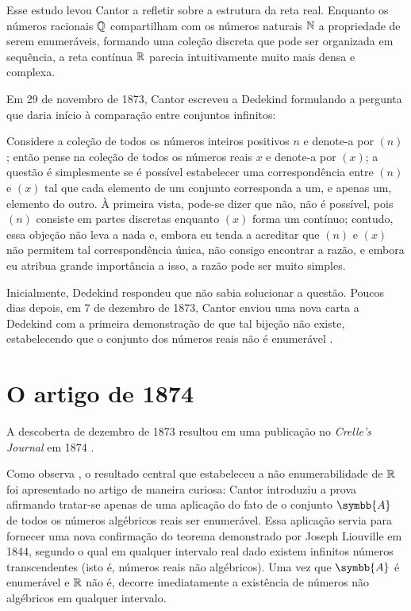 Esse estudo levou Cantor a refletir sobre a estrutura da reta real. Enquanto os números racionais \(\mathbb{Q}\) compartilham com os números naturais \(\mathbb{N}\) a propriedade de serem enumeráveis, formando uma coleção discreta que pode ser organizada em sequência, a reta contínua \(\mathbb{R}\) parecia intuitivamente muito mais densa e complexa.

Em 29 de novembro de 1873, Cantor escreveu a Dedekind formulando a pergunta que daria início à comparação entre conjuntos infinitos:
\begin{citacao}
    Considere a coleção de todos os números inteiros positivos \(n\) e denote-a por \((n)\); então pense na coleção de todos os números reais \(x\) e denote-a por \((x)\); a questão é simplesmente se é possível estabelecer uma correspondência entre \((n)\) e \((x)\) tal que cada elemento de um conjunto corresponda a um, e apenas um, elemento do outro. À primeira vista, pode-se dizer que não, não é possível, pois \((n)\) consiste em partes discretas enquanto \((x)\) forma um contínuo; contudo, essa objeção não leva a nada e, embora eu tenda a acreditar que \((n)\) e \((x)\) não permitem tal correspondência única, não consigo encontrar a razão, e embora eu atribua grande importância a isso, a razão pode ser muito simples. \parencite[p.~50, tradução própria]{dauben1990}
\end{citacao}

Inicialmente, Dedekind respondeu que não sabia solucionar a questão. Poucos dias depois, em 7 de dezembro de 1873, Cantor enviou uma nova carta a Dedekind com a primeira demonstração de que tal bijeção não existe, estabelecendo que o conjunto dos números reais não é enumerável \parencite[p.~51]{dauben1990}.

\section{O artigo de 1874}
\label{sec:artigo_1874}

A descoberta de dezembro de 1873 resultou em uma publicação no \emph{Crelle's Journal} em 1874 \parencite[p.~51]{dauben1990}.

Como observa \textcite[p.~51]{dauben1990}, o resultado central que estabeleceu a não enumerabilidade de \(\mathbb{R}\) foi apresentado no artigo de maneira curiosa: Cantor introduziu a prova afirmando tratar-se apenas de uma aplicação do fato de o conjunto \(\symbb{A}\) de todos os números algébricos reais ser enumerável. Essa aplicação servia para fornecer uma nova confirmação do teorema demonstrado por Joseph Liouville em 1844, segundo o qual em qualquer intervalo real dado existem infinitos números transcendentes (isto é, números reais não algébricos). Uma vez que \(\symbb{A}\) é enumerável e \(\mathbb{R}\) não é, decorre imediatamente a existência de números não algébricos em qualquer intervalo.

